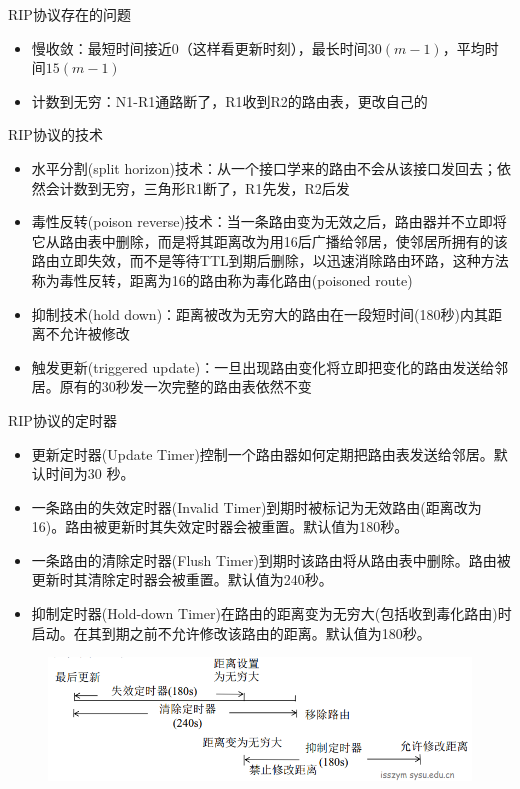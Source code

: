 RIP协议存在的问题
\begin{itemize}
	\item 慢收敛：最短时间接近$0$（这样看更新时刻），最长时间$30(m-1)$，平均时间$15(m-1)$
	\item 计数到无穷：N1-R1通路断了，R1收到R2的路由表，更改自己的
\end{itemize}

RIP协议的技术
\begin{itemize}
	\item 水平分割(split horizon)技术：从一个接口学来的路由不会从该接口发回去；依然会计数到无穷，三角形R1断了，R1先发，R2后发
	\item 毒性反转(poison reverse)技术：当一条路由变为无效之后，路由器并不立即将它从路由表中删除，而是将其距离改为用16后广播给邻居，使邻居所拥有的该路由立即失效，而不是等待TTL到期后删除，以迅速消除路由环路，这种方法称为毒性反转，距离为16的路由称为毒化路由(poisoned route)
	\item 抑制技术(hold down)：距离被改为无穷大的路由在一段短时间(180秒)内其距离不允许被修改
	\item 触发更新(triggered update)：一旦出现路由变化将立即把变化的路由发送给邻居。原有的30秒发一次完整的路由表依然不变
\end{itemize}

RIP协议的定时器
\begin{itemize}
\item 更新定时器(Update Timer)控制一个路由器如何定期把路由表发送给邻居。默认时间为30 秒。
\item 一条路由的失效定时器(Invalid Timer)到期时被标记为无效路由(距离改为16)。路由被更新时其失效定时器会被重置。默认值为180秒。
\item 一条路由的清除定时器(Flush Timer)到期时该路由将从路由表中删除。路由被更新时其清除定时器会被重置。默认值为240秒。
\item 抑制定时器(Hold-down Timer)在路由的距离变为无穷大(包括收到毒化路由)时启动。在其到期之前不允许修改该路由的距离。默认值为180秒。
\end{itemize}
\begin{figure}[H]
	\centering
	\includegraphics[width=0.8\linewidth]{fig/rip_timer.png}
\end{figure}


